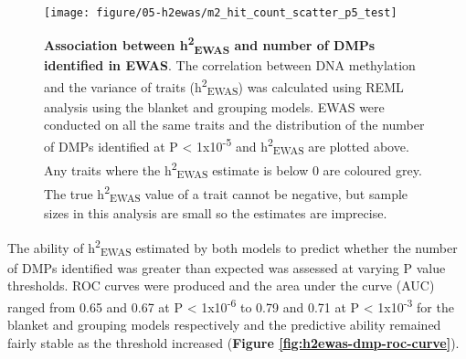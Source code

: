 \documentclass[11pt,oneside]{bristolthesis}
\begin{document}
\begin{figure}

{\centering \texttt{[image: figure/05-h2ewas/m2\_hit\_count\_scatter\_p5\_test]} 

}

\caption[Association between h\textsuperscript{2}\textsubscript{EWAS} and number of DMPs identified in EWAS]{\textbf{Association between h\textsuperscript{2}\textsubscript{EWAS} and number of DMPs identified in EWAS}. The correlation between DNA methylation and the variance of traits (h\textsuperscript{2}\textsubscript{EWAS}) was calculated using REML analysis using the blanket and grouping models. EWAS were conducted on all the same traits and the distribution of the number of DMPs identified at P \textless{} 1x10\textsuperscript{-5} and h\textsuperscript{2}\textsubscript{EWAS} are plotted above. Any traits where the h\textsuperscript{2}\textsubscript{EWAS} estimate is below 0 are coloured grey. The true h\textsuperscript{2}\textsubscript{EWAS} value of a trait cannot be negative, but sample sizes in this analysis are small so the estimates are imprecise.}\label{fig:dmps-and-h2ewas}
\end{figure}
\begin{table}[!h]

\caption{\label{tab:model-testing-tab}Summary of how well models fit to test the association between $h^2_{EWAS}$ and the number of differentially methylated positions identified across 400 traits at P < 1x10$^{-5}$.}
\centering
{}
\end{table}
The ability of h\textsuperscript{2}\textsubscript{EWAS} estimated by both models to predict whether the number of DMPs identified was greater than expected was assessed at varying P value thresholds. ROC curves were produced and the area under the curve (AUC) ranged from 0.65 and 0.67 at P \textless{} 1x10\textsuperscript{-6} to 0.79 and 0.71 at P \textless{} 1x10\textsuperscript{-3} for the blanket and grouping models respectively and the predictive ability remained fairly stable as the threshold increased (\textbf{Figure \ref{fig:h2ewas-dmp-roc-curve}}).
\end{document}
